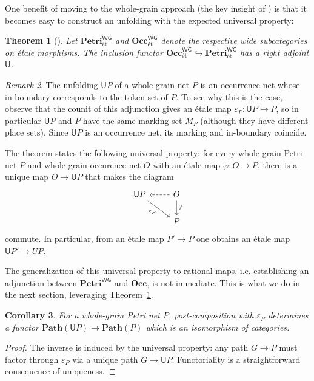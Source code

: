 \documentclass[11pt,a4paper]{article}
\theoremstyle{plain}
\newtheorem{theorem}{Theorem}[section]
\newtheorem{corollary}[theorem]{Corollary}
\theoremstyle{definition}
\theoremstyle{remark}
\newtheorem{remark}[theorem]{Remark}
\newcommand{\Occ}{\mathbf{Occ}}
\newcommand{\WGPetri}{\mathbf{Petri}^{\mathsf{WG}}}
\newcommand{\WGOcc}{\mathbf{Occ}^{\mathsf{WG}}}
\newcommand{\U}{\mathsf{U}}
\newcommand{\Path}{\mathbf{Path}}
\begin{document}
One benefit of moving to the whole-grain approach (the key insight of \cite{WGPN}) is that it becomes easy to construct an unfolding with the expected universal property:
\begin{theorem}[\cite{WGPN}]
\label{ref:thmunfolding-etale}
  Let $\WGPetri_\textrm{\'et}$ and $\WGOcc_{\textrm{\'et}}$ denote the
  respective wide subcategories on \'etale morphisms. The inclusion functor $\WGOcc_{\textrm{\'et}} \hookrightarrow \WGPetri_{\textrm{\'et}}$ has a right adjoint $\U$. 
\end{theorem}

\begin{remark} 
	The unfolding $\U P$ of a whole-grain net $P$ is an occurrence net whose in-boundary corresponds to the token set of $P$. To see why this is the case, observe that the counit of this adjunction gives an \'etale map $\varepsilon_P : \U P \to P$, so in particular $\U P$ and $P$ have the same marking set $M_P$ (although they have different place sets). Since $\U P$ is an occurrence net, its marking and in-boundary coincide.
\end{remark}

The theorem states the following universal property: for every whole-grain Petri net $P$ and whole-grain occurence net $O$ with an \'etale map $\varphi : O \to P$, there is a unique map $O \to \U P$ that makes the diagram 
\[\begin{tikzcd}
	{\U P} & O \\
	& P
	\arrow["\varepsilon_P"',from=1-1, to=2-2]
	\arrow[dashed,from=1-2, to=1-1]
	\arrow["\varphi",from=1-2, to=2-2]
\end{tikzcd}\]
commute. In particular, from an \'etale map $P' \to P$ one obtains an \'etale map $\U P' \to U P$.


The generalization of this universal property to rational maps, i.e. establishing an adjunction between $\WGPetri$ and $\Occ$, is not immediate. This is what we do in the next section, leveraging Theorem~\ref{ref:thmunfolding-etale}.

\begin{corollary}
	For a whole-grain Petri net $P$, post-composition with $\varepsilon_P$ determines a functor $\Path(\U P) \to \Path(P)$ which is an isomorphism of categories. 
\end{corollary}
\begin{proof}
The inverse is induced by the universal property: any path $G \to P$ must factor through $\varepsilon_P$ via a unique path $G \to \U P$. Functoriality is a straightforward consequence of uniqueness. 
\end{proof}
\end{document}
